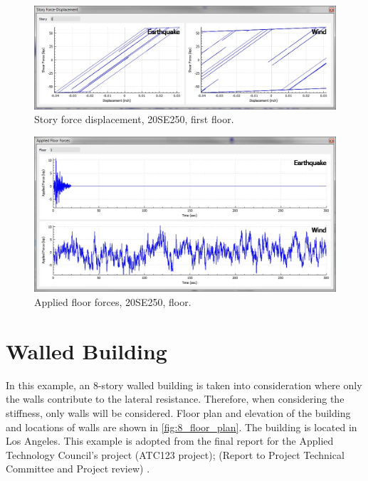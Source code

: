 \documentclass{simcenterdocumentation}
\begin{document}
\begin{figure}[H]
	\centering \includegraphics[scale=0.35]{20SE250_sfd.jpg}
	\caption{Story force displacement, 20SE250, first floor.}
\end{figure}
\begin{figure}[H]
	\centering \includegraphics[scale=0.35]{20SE250_aff.jpg}
	\caption{Applied floor forces, 20SE250,  floor.}
\end{figure}





\section{Walled Building}
In this example, an 8-story walled building is taken into consideration where only the walls contribute to the lateral resistance. Therefore, when considering the stiffness, only walls will be considered. Floor plan and elevation of the building and locations of walls are shown in \cref{fig:8_floor_plan}. The building is located in Los Angeles. This example is adopted from  the final report for the Applied Technology Council’s project (ATC123 project); (Report to Project Technical Committee and Project review) \cite{FEMAp2012}.
\end{document}
